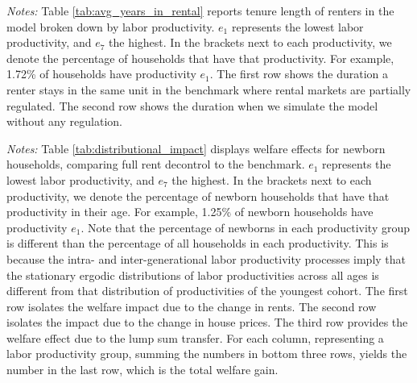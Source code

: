\documentclass[parskip=full]{article}
\newenvironment{fignote2}[1]
{
\par
\medskip
\begin{minipage}{#1}
\footnotesize
}
{
\end{minipage}
}
\begin{document}
\begin{table}[H]
    \centering
    \caption{Avg. years in same rental unit by labor productivity for all renters}
    \vspace{-0.5cm}
    \label{tab:avg_years_in_rental}
    
    \vspace{-0.45cm}
    \begin{fignote2}{1.04\textwidth}
      \textit{Notes:} Table \ref{tab:avg_years_in_rental} reports tenure length of renters in the model broken down by labor productivity. $e_{1}$ represents the lowest labor productivity, and $e_{7}$ the highest. In the brackets next to each productivity, we denote the percentage of households that have that productivity. For example, 1.72\% of households have productivity $e_{1}$. The first row shows the duration a renter stays in the same unit in the benchmark where rental markets are partially regulated. The second row shows the duration when we simulate the model without any regulation.
    \end{fignote2}
\end{table}

\begin{table}[H]
    \centering
    \caption{Newborns' distributional impact of full decontrol by labor productivity}
    \vspace{-0.5cm}
    \label{tab:distributional_impact}
    
    \vspace{-0.45cm}
    \begin{fignote2}{0.95\textwidth}
      \textit{Notes:} Table \ref{tab:distributional_impact} displays welfare effects for newborn households, comparing full rent decontrol to the benchmark. $e_{1}$ represents the lowest labor productivity, and $e_{7}$ the highest. In the brackets next to each productivity, we denote the percentage of newborn households that have that productivity in their age. For example, 1.25\% of newborn households have productivity $e_{1}$. Note that the percentage of newborns in each productivity group is different than the percentage of all households in each productivity. This is because the intra- and inter-generational labor productivity processes imply that the stationary ergodic distributions of labor productivities across all ages is different from that distribution of productivities of the youngest cohort. The first row isolates the welfare impact due to the change in rents. The second row isolates the impact due to the change in house prices. The third row provides the welfare effect due to the lump sum transfer. For each column, representing a labor productivity group, summing the numbers in bottom three rows, yields the number in the last row, which is the total welfare gain.
    \end{fignote2}
\end{table}
\end{document}

